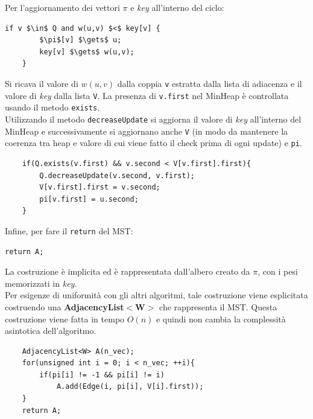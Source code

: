 \documentclass[]{article}
\begin{document}
\begin{flushleft}
	Per l'aggiornamento dei vettori $\pi$ e \textit{key} all'interno del ciclo:
	\begin{lstlisting}[mathescape=true]
	if v $\in$ Q and w(u,v) $<$ key[v] {
		$\pi$[v] $\gets$ u;
		key[v] $\gets$ w(u,v);
	}\end{lstlisting}
	Si ricava il valore di $w(u,v)$ dalla coppia \verb|v| estratta dalla lista di adiacenza e il valore di \textit{key} dalla lista \verb|V|. La presenza di \verb|v.first| nel MinHeap è controllata usando il metodo \verb|exists|.\\
	Utilizzando il metodo \verb|decreaseUpdate| si aggiorna il valore di \textit{key} all'interno del MinHeap e successivamente si aggiornano anche \verb|V| (in modo da mantenere la coerenza tra heap e valore di cui viene fatto il check prima di ogni update) e \verb|pi|.
	\lstset{language=c++, style=mystyle, firstnumber=15}
	\begin{lstlisting}
	if(Q.exists(v.first) && v.second < V[v.first].first){
		Q.decreaseUpdate(v.second, v.first);
		V[v.first].first = v.second;
		pi[v.first] = u.second;
	}\end{lstlisting}
	
	Infine, per fare il \verb|return| del MST:
	\begin{lstlisting}[mathescape=true]
	return A;\end{lstlisting}
	La costruzione è implicita ed è rappresentata dall'albero creato da $\pi$, con i pesi memorizzati in \textit{key}.\\
	Per esigenze di uniformità con gli altri algoritmi, tale costruzione viene esplicitata costruendo una \textbf{AdjacencyList$<$W$>$} che rappresenta il MST. Questa costruzione viene fatta in tempo $O(n)$ e quindi non cambia la complessità asintotica dell'algoritmo. 
	\lstset{language=c++, style=mystyle, firstnumber=22}
	\begin{lstlisting}
	AdjacencyList<W> A(n_vec);
	for(unsigned int i = 0; i < n_vec; ++i){
		if(pi[i] != -1 && pi[i] != i)
			A.add(Edge(i, pi[i], V[i].first));
	}
	return A;\end{lstlisting}
\end{flushleft}
\end{document}
